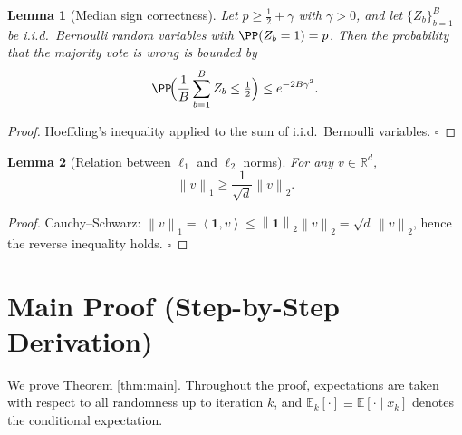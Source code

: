 \documentclass{article}
\newtheorem{lemma}{Lemma}
\newcommand{\EE}{\mathbb{E}}
\newcommand{\RR}{\mathbb{R}}
\newcommand{\norm}[1]{\left\|#1\right\|}
\newcommand{\inner}[2]{\left\langle #1,#2\right\rangle}
\begin{document}
\begin{lemma}[Median sign correctness]\label{lem:median}
Let $p\ge\frac12+\gamma$ with $\gamma>0$, and let $\{Z_{b}\}_{b=1}^{B}$ be i.i.d.\ Bernoulli random variables with $\PP(Z_{b}=1)=p$.
Then the probability that the majority vote is wrong is bounded by
\[
\PP\!\Big(\frac{1}{B}\sum_{b=1}^{B}Z_{b}\le \tfrac12\Big)\le e^{-2B\gamma^{2}}.
\]
\end{lemma}
\begin{proof}
Hoeffding’s inequality applied to the sum of i.i.d.\ Bernoulli variables. \hfill $\square$
\end{proof}

\begin{lemma}[Relation between $\ell_{1}$ and $\ell_{2}$ norms]\label{lem:l1l2}
For any $v\in\RR^{d}$,
\[
\norm{v}_{1}\ge \frac{1}{\sqrt{d}}\norm{v}_{2}.
\]
\end{lemma}
\begin{proof}
Cauchy–Schwarz: $\norm{v}_{1}=\inner{\mathbf{1}}{v}\le \norm{\mathbf{1}}_{2}\norm{v}_{2}=\sqrt{d}\,\norm{v}_{2}$,
hence the reverse inequality holds. \hfill $\square$
\end{proof}

\section*{Main Proof (Step-by-Step Derivation)}

We prove Theorem \ref{thm:main}.  Throughout the proof, expectations are taken with respect to all randomness up to iteration $k$, and $\EE_{k}[\cdot]\equiv\EE[\cdot\mid x_{k}]$ denotes the conditional expectation.
\end{document}
